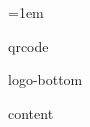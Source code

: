 \documentclass{article}
\begin{document}
\pagestyle{empty}

\raggedright

\parindent=0pt
\parskip=1em


{{qrcode}}

{{logo-bottom}}

{{content}}
\end{document}
